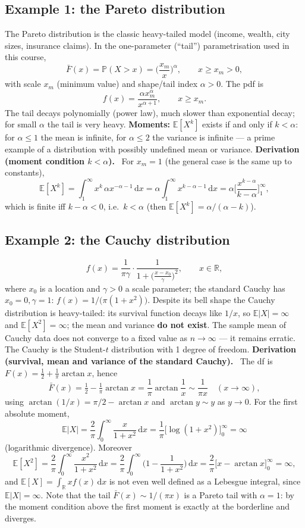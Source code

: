 \documentclass[11pt,a4paper]{article}
\newcommand{\real}{\mathbb{R}}
\newcommand{\E}{\mathbb{E}}
\renewcommand{\P}{\mathbb{P}}
\newcommand{\dd}{\,\mathrm{d}}
\newcommand{\der}[1]{\medskip\noindent\textbf{Derivation (#1).}\ }
\begin{document}
\subsection{Example 1: the Pareto distribution}
The Pareto distribution is the classic heavy-tailed model (income, wealth, city sizes, insurance
claims). In the one-parameter (``tail'') parametrisation used in this course,
\[
  \bar F(x)=\P(X>x)=\Big(\frac{x_m}{x}\Big)^{\alpha},\qquad x\ge x_m>0,
\]
with scale $x_m$ (minimum value) and shape/tail index $\alpha>0$. The pdf is
\[
  f(x)=\frac{\alpha x_m^{\alpha}}{x^{\alpha+1}},\qquad x\ge x_m .
\]
The tail decays polynomially (power law), much slower than exponential decay; for small $\alpha$ the
tail is very heavy. \textbf{Moments:} $\E[X^k]$ exists if and only if $k<\alpha$: for $\alpha\le1$ the
mean is infinite, for $\alpha\le2$ the variance is infinite --- a prime example of a distribution with
possibly undefined mean or variance.
\der{moment condition $k<\alpha$}
For $x_m=1$ (the general case is the same up to constants),
\[
  \E[X^k]=\int_1^\infty x^k\,\alpha x^{-\alpha-1}\dd x
         =\alpha\int_1^\infty x^{k-\alpha-1}\dd x
         =\alpha\Big[\frac{x^{k-\alpha}}{k-\alpha}\Big]_1^\infty ,
\]
which is finite iff $k-\alpha<0$, i.e.\ $k<\alpha$ (then $\E[X^k]=\alpha/(\alpha-k)$).

\subsection{Example 2: the Cauchy distribution}
\[
  f(x)=\frac{1}{\pi\gamma}\cdot\frac{1}{1+\big(\frac{x-x_0}{\gamma}\big)^2},\qquad x\in\real,
\]
where $x_0$ is a location and $\gamma>0$ a scale parameter; the standard Cauchy has $x_0=0,\gamma=1$:
$f(x)=1/\big(\pi(1+x^2)\big)$.
Despite its bell shape the Cauchy distribution is heavy-tailed: its survival function decays like
$1/x$, so $\E|X|=\infty$ and $\E[X^2]=\infty$; the mean and variance \textbf{do not exist}. The sample
mean of Cauchy data does not converge to a fixed value as $n\to\infty$ --- it remains erratic. The
Cauchy is the Student-$t$ distribution with 1 degree of freedom.
\der{survival, mean and variance of the standard Cauchy}
The df is $F(x)=\tfrac12+\tfrac1\pi\arctan x$, hence
\[
  \bar F(x)=\tfrac12-\tfrac1\pi\arctan x=\frac1\pi\arctan\frac1x\sim\frac{1}{\pi x}\quad(x\to\infty),
\]
using $\arctan(1/x)=\pi/2-\arctan x$ and $\arctan y\sim y$ as $y\to0$. For the first absolute moment,
\[
  \E|X|=\frac{2}{\pi}\int_0^\infty\frac{x}{1+x^2}\dd x
       =\frac{1}{\pi}\Big[\log(1+x^2)\Big]_0^\infty=\infty
\]
(logarithmic divergence). Moreover
\[
  \E[X^2]=\frac{2}{\pi}\int_0^\infty \frac{x^2}{1+x^2}\dd x
        =\frac{2}{\pi}\int_0^\infty\Big(1-\frac{1}{1+x^2}\Big)\dd x
        =\frac{2}{\pi}\Big[x-\arctan x\Big]_0^\infty=\infty,
\]
and $\E[X]=\int_\real x f(x)\dd x$ is not even well defined as a Lebesgue integral, since
$\E|X|=\infty$. Note that the tail
$\bar F(x)\sim1/(\pi x)$ is a Pareto tail with $\alpha=1$: by the moment condition above the first
moment is exactly at the borderline and diverges.
\end{document}
